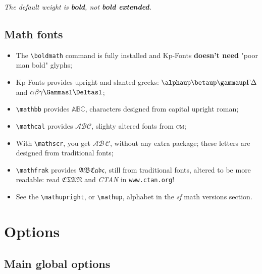 \documentclass[a4paper,11pt]{article}
\begin{document}
\begin{center}\itshape
The default weight is \textbf{bold}, not \textbf{bold extended}.
\end{center}

\subsection{Math fonts}

\begin{itemize}
	\item The \verb+\boldmath+ command is fully installed and Kp-Fonts \textbf{doesn't need} "poor man bold" glyphs;
	\item Kp-Fonts provides upright and slanted greeks: $\alphaup\betaup\gammaup\Gamma\Delta$ and $\alpha\beta\gamma\Gammasl\Deltasl$;
	\item \verb=\mathbb= provides $\mathbb{ABC}$, characters designed from capital upright roman;  
	\item \verb=\mathcal= provides $\mathcal{ABC}$, slighty altered fonts from \textsc{cm};
	\item With \verb=\mathscr=, you get $\mathscr{AB}\,\mathscr{C}$, without any extra package; these letters are designed from traditional fonts;
	\item \verb=\mathfrak= provides $\mathfrak{ABCabc}$, still from traditional fonts, altered to be more readable:
	read $\mathfrak{CTAN}$ and \textit{CTAN} in \texttt{www.ctan.org}!
	\item See the \verb=\mathupright=, or \verb=\mathup=, alphabet in the \textit{sf} math versions section.
\end{itemize}

\section{Options}

\subsection{Main global options}
\end{document}
